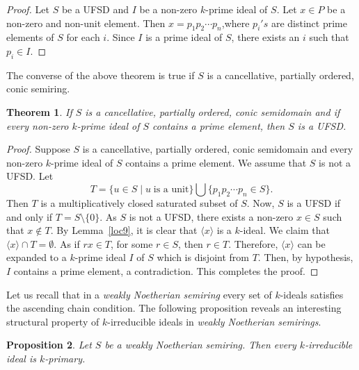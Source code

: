 \documentclass[11pt,english]{amsart}
\newtheorem{theorem}{Theorem}[section]
\newtheorem{proposition}[theorem]{Proposition}
\theoremstyle{definition}
\numberwithin{equation}{section}
\begin{document}
\begin{proof}
Let $S$ be a UFSD and $I$ be a non-zero $k$-prime ideal of $S$. Let $x\in P$ be a non-zero and non-unit element. Then $x=p_1p_2\cdots p_n$,where $p_i's$ are distinct prime elements of $S$ for each $i$. Since $I$ is a prime ideal of $S$, there exists an $i$ such that $p_i\in I$. 
\end{proof}

The converse of the above theorem is true if $S$ is a cancellative, partially ordered, conic semiring.

\begin{theorem}
    If $S$ is a cancellative, partially ordered, conic semidomain and if every non-zero $k$-prime ideal of $S$ contains a prime element, then $S$ is a \emph{UFSD}.
\end{theorem}

\begin{proof}
Suppose $S$ is a cancellative, partially ordered, conic semidomain and every non-zero $k$-prime ideal of $S$ contains a prime element. We assume that $S$ is not a UFSD. Let \[T=\{u\in S \mid u \;\text{is a unit} \} \bigcup \{p_1p_2\cdots p_n\in S\}.\] Then $T$ is a multiplicatively closed saturated subset of $S$. Now, $S$ is a UFSD if and only if $T=S\setminus \{0\}$. As $S$ is not a UFSD, there exists a non-zero $x\in S$ such that $x\notin T$. By Lemma~\ref{loc9}, it is clear that $\langle x\rangle$ is a $k$-ideal. We claim that $\langle x\rangle \cap T=\emptyset$. As if $rx\in T$, for some $r\in S$, then $r\in T$. Therefore, $\langle x \rangle$ can be expanded to a $k$-prime ideal $I$ of $S$ which is disjoint from $T$. Then, by hypothesis, $I$ contains a prime element, a contradiction. This completes the proof.
\end{proof}

Let us recall that in a \emph{weakly Noetherian semiring} every set of $k$-ideals satisfies the ascending chain condition. The following proposition reveals an interesting structural property of $k$-irreducible ideals in \emph{weakly Noetherian semirings}. 

\begin{proposition}\label{weakly Noetherian semiring, every k-irreducible ideal is k-primary}
    Let $S$ be a weakly Noetherian semiring. Then every $k$-irreducible ideal is $k$-primary.
\end{proposition}
\end{document}
